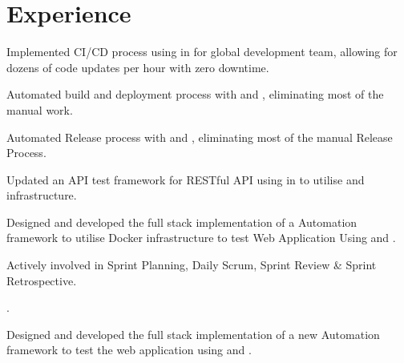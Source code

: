\documentclass[]{openfont}
\begin{document}
\begin{minipage}[t]{0.66\textwidth} 


\section{Experience}

\vspace{\topsep} %
\begin{tightemize}
\item Implemented CI/CD process using  in  for global development team, allowing for dozens of code updates per hour with zero downtime.
\item Automated build and deployment process with  and , eliminating most of the manual work.
\item Automated Release process with  and , eliminating most of the manual Release Process.
\item Updated an API test framework for RESTful API using  in  to utilise  and  infrastructure.
\item Designed and developed the full stack implementation of a Automation framework to utilise Docker infrastructure to test Web Application Using  and .
\item Actively involved in Sprint Planning, Daily Scrum, Sprint Review \& Sprint Retrospective.
\item {}.
\end{tightemize}
\sectionsep

\begin{tightemize}
\item Designed and developed the full stack implementation of a new Automation framework to test the web application using  and .
\end{tightemize}
\sectionsep


\end{minipage}
\end{document}
